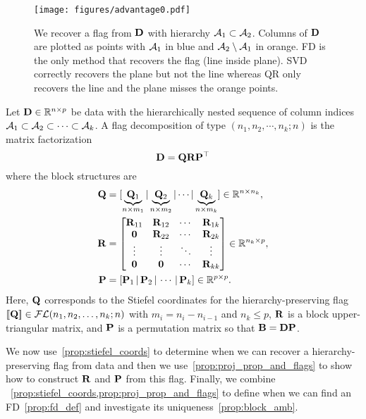 \begin{figure}[t]
    \centering
    \texttt{[image: figures/advantage0.pdf]}
    \vspace{-1mm}
    \caption{We recover a flag from $\mathbf{D}$ with hierarchy $\mathcal{A}_1 \subset \mathcal{A}_2$. Columns of $\mathbf{D}$ are plotted as points with $\mathcal{A}_1$ in blue and $\mathcal{A}_2 \setminus \mathcal{A}_1$ in orange. FD is the only method that recovers the flag (line inside plane). SVD correctly recovers the plane but not the line whereas QR only recovers the line and the plane misses the orange points.}\vspace{-4mm}
    \label{fig:flag cartoon1}
\end{figure}
\begin{dfn}
    Let $\mathbf{D} \in \mathbb{R}^{n \times p}$ be data with the hierarchically nested sequence of column indices $\mathcal{A}_1 \subset \mathcal{A}_2 \subset \cdots \subset \mathcal{A}_k$. A flag decomposition of type $(n_1,n_2, \cdots, n_k; n)$ is the matrix factorization
    \begin{equation}
        \mathbf{D} = \mathbf{Q} \mathbf{R} \mathbf{P}^\top
    \end{equation}
    where the block structures are
    \begin{align}
        \mathbf{Q} &= [\underbrace{\mathbf{Q}_1}_{n \times m_1} | \underbrace{\mathbf{Q}_2}_{n \times m_2} | \cdots | \underbrace{\mathbf{Q}_k}_{n \times m_k} ] \in \mathbb{R}^{n \times n_k},\\
        \mathbf{R} &= \begin{bmatrix}
            \mathbf{R}_{11} & \mathbf{R}_{12} & \cdots & \mathbf{R}_{1k}\\
            \mathbf{0} & \mathbf{R}_{22} & \cdots & \mathbf{R}_{2k}\\
            \vdots & \vdots & \ddots & \vdots\\
            \mathbf{0} & \mathbf{0} & \cdots & \mathbf{R}_{kk} \end{bmatrix} \in \mathbb{R}^{n_k \times p}, \\
        \mathbf{P} &= [\mathbf{P}_1 \,|\, \mathbf{P}_2 \,|\, \cdots \,|\, \mathbf{P}_k] \in \mathbb{R}^{p \times p}.
    \end{align}
    Here, $\mathbf{Q}$ corresponds to the Stiefel coordinates for the hierarchy-preserving flag $[\![\mathbf{Q}]\!] \in \mathcal{FL}(n_1,n_2,\dots, n_k;n)$ with $m_i=n_i - n_{i-1}$ and $n_k \leq p$, $\mathbf{R}$ is a block upper-triangular matrix, and $\mathbf{P}$ is a permutation matrix so that $\mathbf{B} = \mathbf{D} \mathbf{P}$.
\end{dfn}



We now use~\cref{prop:stiefel_coords} to determine when we can recover a hierarchy-preserving flag from data and then we use~\cref{prop:proj_prop_and_flags} to show how to construct $\mathbf{R}$ and $\mathbf{P}$ from this flag. Finally, we combine ~\cref{prop:stiefel_coords,prop:proj_prop_and_flags} to define when we can find an FD~\cref{prop:fd_def} and investigate its uniqueness~\cref{prop:block_amb}.


